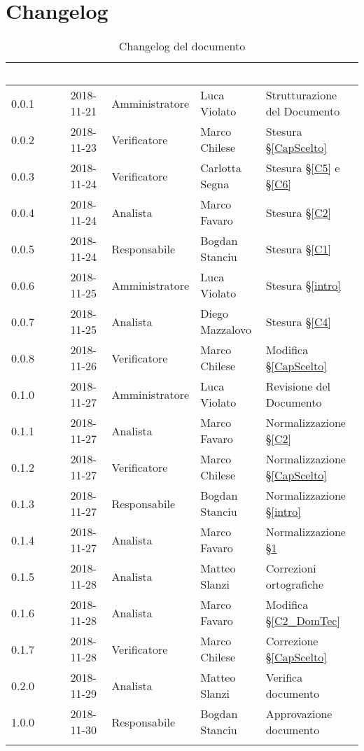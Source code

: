 \section{Changelog}\label{changelog}

\begin{center}
\begin{longtable}[c]{|m{}|m{}|m{}|m{}|p{}|}
\hline
\rowcolor{bluelogo}\textbf{\textcolor{white}{Versione}} & \textbf{\textcolor{white}{Data}}  & \textbf{\textcolor{white}{Ruolo}} & \textbf{\textcolor{white}{Autore}} & \textbf{\textcolor{white}{Descrizione}} \\
\hline \hline
\endfirsthead
0.0.1 & 2018-11-21  & Amministratore & Luca Violato & Strutturazione del Documento \\
\hline
\rowcolor{grigio}0.0.2 & 2018-11-23  & Verificatore & Marco Chilese & Stesura §\ref{CapScelto} \\
\hline
0.0.3 & 2018-11-24  & Verificatore & Carlotta Segna & Stesura §\ref{C5} e §\ref{C6} \\
\hline
\rowcolor{grigio}0.0.4 & 2018-11-24  & Analista & Marco Favaro & Stesura §\ref{C2} \\
\hline
0.0.5 & 2018-11-24  & Responsabile & Bogdan Stanciu & Stesura §\ref{C1}\\
\hline
\rowcolor{grigio}0.0.6 & 2018-11-25  & Amministratore & Luca Violato & Stesura §\ref{intro}\\
\hline
0.0.7 & 2018-11-25  & Analista & Diego Mazzalovo & Stesura §\ref{C4} \\
\hline
\rowcolor{grigio}0.0.8 & 2018-11-26  & Verificatore & Marco Chilese & Modifica §\ref{CapScelto} \\
\hline
0.1.0 & 2018-11-27  & Amministratore & Luca Violato & Revisione del Documento\\
\hline
\rowcolor{grigio}0.1.1 & 2018-11-27 & Analista & Marco Favaro  & Normalizzazione §\ref{C2}\\
\hline
0.1.2 & 2018-11-27  & Verificatore & Marco Chilese & Normalizzazione §\ref{CapScelto}\\
\hline
\rowcolor{grigio}0.1.3 & 2018-11-27  & Responsabile & Bogdan Stanciu & Normalizzazione §\ref{intro}\\
\hline
0.1.4 & 2018-11-27  & Analista & Marco Favaro & Normalizzazione §\ref{changelog}\\
\hline
\rowcolor{grigio}0.1.5 & 2018-11-28 & Analista & Matteo Slanzi & Correzioni ortografiche\\
\hline
0.1.6 & 2018-11-28 & Analista & Marco Favaro & Modifica §\ref{C2_DomTec}\\
\hline
\rowcolor{grigio}0.1.7 & 2018-11-28 & Verificatore & Marco Chilese  & Correzione §\ref{CapScelto}\\
\hline
0.2.0 & 2018-11-29 & Analista & Matteo Slanzi  & Verifica documento\\
\hline
\rowcolor{grigio}1.0.0 & 2018-11-30 & Responsabile & Bogdan Stanciu & Approvazione documento\\
\hline
\caption{Changelog del documento}
\end{longtable}
\end{center}
